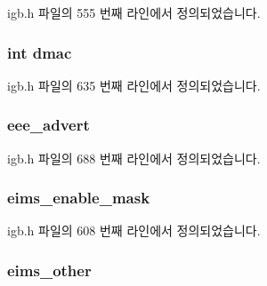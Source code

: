 igb.\+h 파일의 555 번째 라인에서 정의되었습니다.

\subsubsection[{\texorpdfstring{dmac}{dmac}}]{\setlength{\rightskip}{0pt plus 5cm}int dmac}\hypertarget{structigb__adapter_ac21b4c93238d5fcc3fff9702dfd9eda3}{}\label{structigb__adapter_ac21b4c93238d5fcc3fff9702dfd9eda3}


igb.\+h 파일의 635 번째 라인에서 정의되었습니다.

\subsubsection[{\texorpdfstring{eee\+\_\+advert}{eee_advert}}]{ eee\+\_\+advert}\hypertarget{structigb__adapter_a2792341c9e7952578b25d76bedd9a5e4}{}\label{structigb__adapter_a2792341c9e7952578b25d76bedd9a5e4}


igb.\+h 파일의 688 번째 라인에서 정의되었습니다.

\subsubsection[{\texorpdfstring{eims\+\_\+enable\+\_\+mask}{eims_enable_mask}}]{ eims\+\_\+enable\+\_\+mask}\hypertarget{structigb__adapter_a4a7e158c8d93b26d1caf1936dc15a269}{}\label{structigb__adapter_a4a7e158c8d93b26d1caf1936dc15a269}


igb.\+h 파일의 608 번째 라인에서 정의되었습니다.

\subsubsection[{\texorpdfstring{eims\+\_\+other}{eims_other}}]{ eims\+\_\+other}\hypertarget{structigb__adapter_abf76408eafd71916cf6850fb3b1e7379}{}\label{structigb__adapter_abf76408eafd71916cf6850fb3b1e7379}


